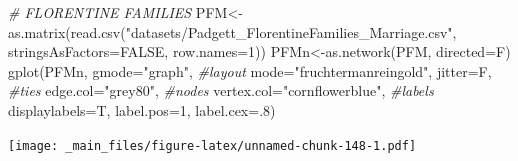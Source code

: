 \documentclass[
  notitlepage,
  onecolumn,
  openany]{book}
\newenvironment{Shaded}{\begin{snugshade}}{\end{snugshade}}
\newcommand{\AttributeTok}[1]{\textcolor[rgb]{0.77,0.63,0.00}{#1}}
\newcommand{\CommentTok}[1]{\textcolor[rgb]{0.56,0.35,0.01}{\textit{#1}}}
\newcommand{\ConstantTok}[1]{\textcolor[rgb]{0.00,0.00,0.00}{#1}}
\newcommand{\DecValTok}[1]{\textcolor[rgb]{0.00,0.00,0.81}{#1}}
\newcommand{\FunctionTok}[1]{\textcolor[rgb]{0.00,0.00,0.00}{#1}}
\newcommand{\NormalTok}[1]{#1}
\newcommand{\OtherTok}[1]{\textcolor[rgb]{0.56,0.35,0.01}{#1}}
\newcommand{\StringTok}[1]{\textcolor[rgb]{0.31,0.60,0.02}{#1}}
\begin{document}
\begin{Shaded}
\begin{Highlighting}[]
\CommentTok{\# FLORENTINE FAMILIES}
\NormalTok{PFM}\OtherTok{\textless{}{-}}\FunctionTok{as.matrix}\NormalTok{(}\FunctionTok{read.csv}\NormalTok{(}\StringTok{"datasets/Padgett\_FlorentineFamilies\_Marriage.csv"}\NormalTok{,}
                        \AttributeTok{stringsAsFactors=}\ConstantTok{FALSE}\NormalTok{, }\AttributeTok{row.names=}\DecValTok{1}\NormalTok{))}
\NormalTok{PFMn}\OtherTok{\textless{}{-}}\FunctionTok{as.network}\NormalTok{(PFM, }\AttributeTok{directed=}\NormalTok{F)}
\FunctionTok{gplot}\NormalTok{(PFMn, }
      \AttributeTok{gmode=}\StringTok{"graph"}\NormalTok{,}
      \CommentTok{\#layout}
      \AttributeTok{mode=}\StringTok{"fruchtermanreingold"}\NormalTok{,}
      \AttributeTok{jitter=}\NormalTok{F,}
      \CommentTok{\#ties}
      \AttributeTok{edge.col=}\StringTok{"grey80"}\NormalTok{,}
      \CommentTok{\#nodes}
      \AttributeTok{vertex.col=}\StringTok{"cornflowerblue"}\NormalTok{,}
      \CommentTok{\#labels}
      \AttributeTok{displaylabels=}\NormalTok{T,}
      \AttributeTok{label.pos=}\DecValTok{1}\NormalTok{,}
      \AttributeTok{label.cex=}\NormalTok{.}\DecValTok{8}\NormalTok{)}
\end{Highlighting}
\end{Shaded}

\texttt{[image: \_main\_files/figure-latex/unnamed-chunk-148-1.pdf]}
\end{document}
